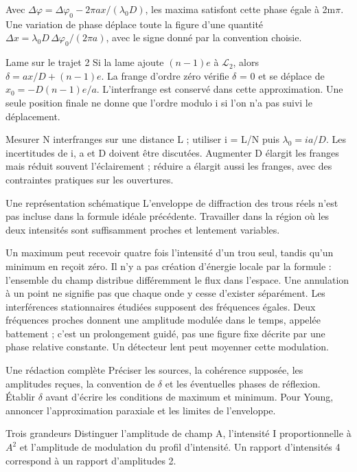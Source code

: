 Avec $\Delta\varphi=\Delta\varphi_0-2\pi ax/(\lambda_0D)$, les maxima satisfont cette phase égale à 2m\ensuremath{\pi}. Une variation de phase déplace toute la figure d’une quantité $\Delta x=\lambda_0D\,\Delta\varphi_0/(2\pi a)$, avec le signe donné par la convention choisie.
\begin{methode}{Lame sur le trajet 2}
Si la lame ajoute $(n-1)e$ à $\mathcal L_2$, alors $\delta=ax/D+(n-1)e$. La frange d’ordre zéro vérifie \ensuremath{\delta} = 0 et se déplace de $x_0=-D(n-1)e/a$. L’interfrange est conservé dans cette approximation. Une seule position finale ne donne que l’ordre modulo i si l’on n’a pas suivi le déplacement.
\end{methode}
Mesurer N interfranges sur une distance L ; utiliser i = L/N puis $\lambda_0=ia/D$. Les incertitudes de i, a et D doivent être discutées. Augmenter D élargit les franges mais réduit souvent l’éclairement ; réduire a élargit aussi les franges, avec des contraintes pratiques sur les ouvertures.
\begin{docu}{Une représentation schématique}
L’enveloppe de diffraction des trous réels n’est pas incluse dans la formule idéale précédente. Travailler dans la région où les deux intensités sont suffisamment proches et lentement variables.
\end{docu}


Un maximum peut recevoir quatre fois l’intensité d’un trou seul, tandis qu’un minimum en reçoit zéro. Il n’y a pas création d’énergie locale par la formule : l’ensemble du champ distribue différemment le flux dans l’espace. Une annulation à un point ne signifie pas que chaque onde y cesse d’exister séparément.
Les interférences stationnaires étudiées supposent des fréquences égales. Deux fréquences proches donnent une amplitude modulée dans le temps, appelée battement ; c’est un prolongement guidé, pas une figure fixe décrite par une phase relative constante. Un détecteur lent peut moyenner cette modulation.
\begin{methode}{Une rédaction complète}
Préciser les sources, la cohérence supposée, les amplitudes reçues, la convention de \ensuremath{\delta} et les éventuelles phases de réflexion. Établir \ensuremath{\delta} avant d’écrire les conditions de maximum et minimum. Pour Young, annoncer l’approximation paraxiale et les limites de l’enveloppe.
\end{methode}
\begin{piege}{Trois grandeurs}
Distinguer l’amplitude de champ A, l’intensité I proportionnelle à $A^2$ et l’amplitude de modulation du profil d’intensité. Un rapport d’intensités 4 correspond à un rapport d’amplitudes 2.
\end{piege}


